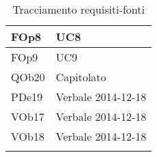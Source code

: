 \begin{longtable}{|l|p{4cm}|}
\hline
FOp8 & UC8 \linebreak \\ 
\hline
FOp9 & UC9 \linebreak \\ 
\hline
QOb20 & Capitolato \linebreak \\ 
\hline
PDe19 & Verbale 2014-12-18 \linebreak \\ 
\hline
VOb17 & Verbale 2014-12-18 \linebreak \\ 
\hline
VOb18 & Verbale 2014-12-18 \linebreak \\ 
\hline
\caption{Tracciamento requisiti-fonti}
\end{longtable}
	
